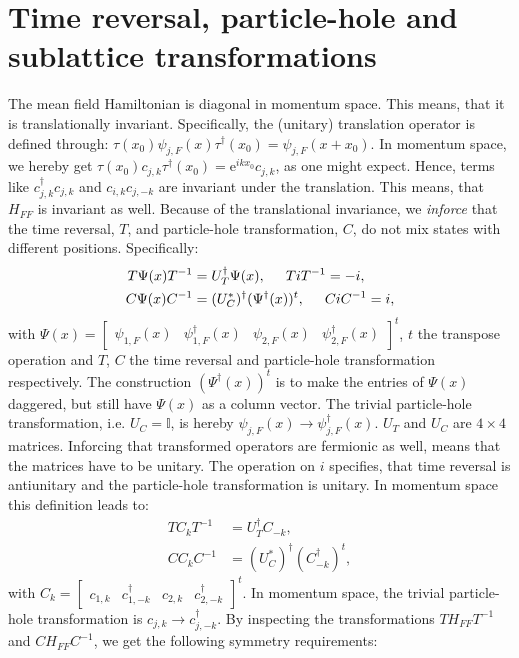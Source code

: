 \section{Time reversal, particle-hole and sublattice transformations}
\label{sec.SymmetriesTRandPH}
The mean field Hamiltonian is diagonal in momentum space. This means, that it is translationally invariant. Specifically, the (unitary) translation operator is defined through: $\tau(x_0)\psi_{j,F}(x)\tau^\dagger (x_0) = \psi_{j,F}(x + x_0)$. In momentum space, we hereby get $\tau(x_0) c_{j,k} \tau^\dagger(x_0) = \text{e}^{ikx_0}c_{j,k}$, as one might expect. Hence, terms like $c^\dagger_{j,k} c_{j,k}$ and $c_{i,k}c_{j,-k}$ are invariant under the translation. This means, that $H_{FF}$ is invariant as well. Because of the translational invariance, we \textit{inforce} that the time reversal, $T$, and particle-hole transformation, $C$, do not mix states with different positions. Specifically:
\begin{align}
T \Psi(x) T^{-1} &= U^\dagger_T \Psi(x), \hspace{0.5cm} TiT^{-1} = -i, \nonumber \\
C \Psi(x) C^{-1} &= (U^*_C)^\dagger (\Psi^\dagger(x))^t, \hspace{0.5cm} CiC^{-1} = i, 
\label{eq.TRandPH.realspace}
\end{align}
with $\Psi(x) = \begin{bmatrix} \psi_{1,F}(x) & \psi^\dagger_{1,F}(x) & \psi_{2,F}(x) & \psi^\dagger_{2,F}(x) \end{bmatrix}^t$, $t$ the transpose operation and $T$, $C$ the time reversal and particle-hole transformation respectively. The construction $(\Psi^\dagger(x))^t$ is to make the entries of $\Psi(x)$ daggered, but still have $\Psi(x)$ as a column vector. The trivial particle-hole transformation, i.e. $U_C = \mathbb{I}$, is hereby $\psi_{j,F}(x) \to \psi^\dagger_{j,F}(x)$. $U_T$ and $U_C$ are $4\times 4$ matrices. Inforcing that transformed operators are fermionic as well, means that the matrices have to be unitary. The operation on $i$ specifies, that time reversal is antiunitary and the particle-hole transformation is unitary. In momentum space this definition leads to:
\begin{align}
T C_k T^{-1} &= U^\dagger_T C_{-k}, \nonumber \\
C C_k C^{-1} &= (U^*_C)^\dagger (C^\dagger_{-k})^t,  
\label{eq.TRandPH.momentumspace}
\end{align}
with $C_k = \begin{bmatrix} c_{1,k} & c^\dagger_{1,-k} & c_{2,k} & c^\dagger_{2,-k} \end{bmatrix}^t$. In momentum space, the trivial particle-hole transformation is $c_{j,k} \to c^\dagger_{j,-k}$. By inspecting the transformations $TH_{FF}T^{-1}$ and $CH_{FF}C^{-1}$, we get the following symmetry requirements:
